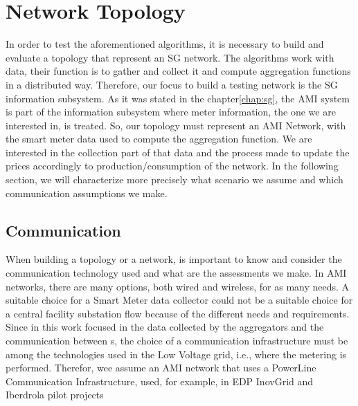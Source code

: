 \chapter{Network Topology}
In order to test the aforementioned algorithms, it is necessary to build  and evaluate a topology that represent an SG network. The algorithms work with data, their function is to gather and collect it  and compute aggregation functions in a distributed way. Therefore, our focus to build a testing network is the SG information subsystem. As it was stated in the chapter\ref{chap:sg}, the AMI system is part of the information subsystem where meter information, the one we are interested in, is  treated. So, our topology must represent an AMI Network, with the smart meter data used to compute the aggregation function. We are interested in the collection part of that data and the process made to update the prices accordingly to production/consumption of the network. In the following section, we will characterize more precisely what scenario we assume and which communication assumptions we make.


\section{Communication}
When building a topology or a network, is important to know and consider  the communication technology used and what are the assessments we make. In AMI networks, there are many options, both wired and wireless, for as many needs. A suitable choice for a Smart Meter data collector could not be a suitable choice for a central facility substation flow because of the different needs and requirements. Since in this work focused in the data collected by the aggregators and the communication between s, the choice of a communication infrastructure must be among the technologies used in the Low Voltage grid, i.e., where the metering is performed. Therefor, wee assume an AMI network that uses a PowerLine Communication Infrastructure, used, for example, in EDP InovGrid\cite{matos2013inovgrid} and Iberdrola pilot projects \cite{sendin2012performance}
